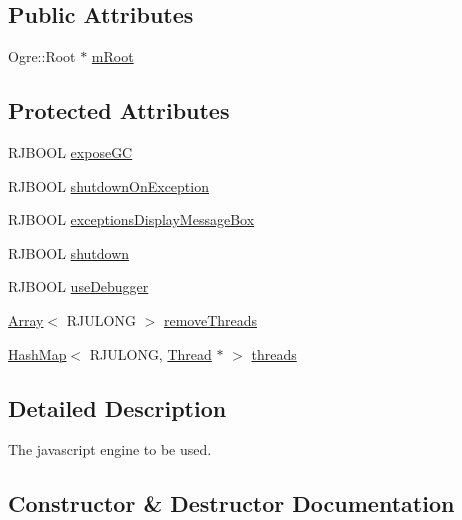 \subsection*{Public Attributes}
\begin{DoxyCompactItemize}
\item 
Ogre\+::\+Root $\ast$ \mbox{\hyperlink{class_rad_j_a_v_1_1_javascript_engine_af494f1d171ea6dbdcccdee1d03f0ca4e}{m\+Root}}
\end{DoxyCompactItemize}
\subsection*{Protected Attributes}
\begin{DoxyCompactItemize}
\item 
R\+J\+B\+O\+OL \mbox{\hyperlink{class_rad_j_a_v_1_1_javascript_engine_ab9d5626eb48dd87bba44eb8db6628cc4}{expose\+GC}}
\item 
R\+J\+B\+O\+OL \mbox{\hyperlink{class_rad_j_a_v_1_1_javascript_engine_ad24ee9119907ff362ac00f7394c665d8}{shutdown\+On\+Exception}}
\item 
R\+J\+B\+O\+OL \mbox{\hyperlink{class_rad_j_a_v_1_1_javascript_engine_ae32ec13d271fa8e9de7076bf19de5fae}{exceptions\+Display\+Message\+Box}}
\item 
R\+J\+B\+O\+OL \mbox{\hyperlink{class_rad_j_a_v_1_1_javascript_engine_a119dba6e5ced56e7c242129993b94556}{shutdown}}
\item 
R\+J\+B\+O\+OL \mbox{\hyperlink{class_rad_j_a_v_1_1_javascript_engine_a64acee3048eba4322c648cad00bc200e}{use\+Debugger}}
\item 
\mbox{\hyperlink{class_rad_j_a_v_1_1_array}{Array}}$<$ R\+J\+U\+L\+O\+NG $>$ \mbox{\hyperlink{class_rad_j_a_v_1_1_javascript_engine_aef0c33700408735d821031b2bcdc77cc}{remove\+Threads}}
\item 
\mbox{\hyperlink{namespace_rad_j_a_v_a7c83af3095bdd8035fd71ff008120f08}{Hash\+Map}}$<$ R\+J\+U\+L\+O\+NG, \mbox{\hyperlink{class_rad_j_a_v_1_1_thread}{Thread}} $\ast$ $>$ \mbox{\hyperlink{class_rad_j_a_v_1_1_javascript_engine_a5ed20d1c0b0bfa1608b5991c71dfd5e9}{threads}}
\end{DoxyCompactItemize}


\subsection{Detailed Description}
The javascript engine to be used. 

\subsection{Constructor \& Destructor Documentation}
\mbox{\label{class_rad_j_a_v_1_1_javascript_engine_a148c454c66e90614abbc589e715b3f7c}} 
